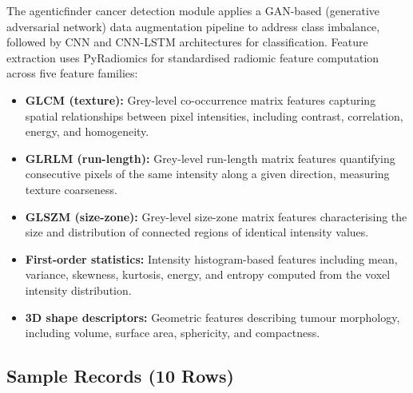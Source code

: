 The agenticfinder cancer detection module applies a GAN-based (generative adversarial network) data augmentation pipeline to address class imbalance, followed by CNN and CNN-LSTM architectures for classification. Feature extraction uses PyRadiomics for standardised radiomic feature computation across five feature families:

\begin{itemize}[leftmargin=*, itemsep=3pt]
\item \textbf{GLCM (texture):} Grey-level co-occurrence matrix features capturing spatial relationships between pixel intensities, including contrast, correlation, energy, and homogeneity.
\item \textbf{GLRLM (run-length):} Grey-level run-length matrix features quantifying consecutive pixels of the same intensity along a given direction, measuring texture coarseness.
\item \textbf{GLSZM (size-zone):} Grey-level size-zone matrix features characterising the size and distribution of connected regions of identical intensity values.
\item \textbf{First-order statistics:} Intensity histogram-based features including mean, variance, skewness, kurtosis, energy, and entropy computed from the voxel intensity distribution.
\item \textbf{3D shape descriptors:} Geometric features describing tumour morphology, including volume, surface area, sphericity, and compactness.
\end{itemize}

\subsection{Sample Records (10 Rows)}

